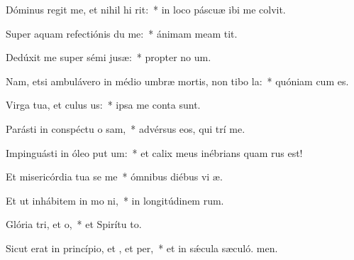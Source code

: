 \item Dóminus regit me, et nihil hi rit:~* in loco páscuæ ibi me colvit.
\item Super aquam refectiónis du me:~* ánimam meam tit.
\item Dedúxit me super sémi jusæ:~* propter no um.
\item Nam, etsi ambulávero in médio umbræ mortis, non tibo la:~* quóniam  cum es.
\item Virga tua, et culus us:~* ipsa me conta sunt.
\item Parásti in conspéctu o sam,~* advérsus eos, qui trí me.
\item Impinguásti in óleo put um:~* et calix meus inébrians quam rus est!
\item Et misericórdia tua se me~* ómnibus diébus vi æ.
\item Et ut inhábitem in mo ni,~* in longitúdinem rum.
\item Glória tri, et o,~* et Spirítu to.
\item Sicut erat in princípio, et , et per,~* et in sǽcula sæculó. men.
